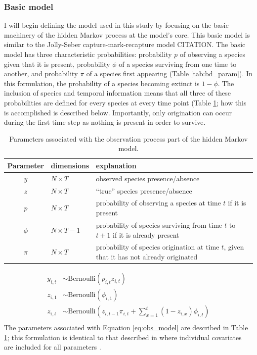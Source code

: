 \documentclass[12pt,letterpaper]{article}
\begin{document}
\subsubsection*{Basic model}
I will begin defining the model used in this study by focusing on the basic machinery of the hidden Markov process at the model's core. This basic model is similar to the Jolly-Seber capture-mark-recapture model CITATION.
The basic model has three characteristic probabilities: probability \(p\) of observing a species given that it is present, probability \(\phi\) of a species surviving from one time to another, and probability \(\pi\) of a species first appearing \citep{Royle2008} (Table \ref{tab:bd_param}). In this formulation, the probability of a species becoming extinct is \(1 - \phi\). The inclusion of species and temporal information means that all three of these probabilities are defined for every species at every time point (Table \ref{tab:obs_param}; how this is accomplished is described below. Importantly, only origination can occur during the first time step as nothing is present in order to survive.


\begin{table}
  \centering
  \caption{Parameters associated with the observation process part of the hidden Markov model.}
  \begin{tabular}{c l l}
    Parameter & dimensions & explanation \\
    \hline
    \(y\) & \(N \times T\) & observed species presence/absence \\
    \(z\) & \(N \times T\) & ``true'' species presence/absence \\
    \(p\) & \(N \times T\) & probability of observing a species at time \(t\) if it is present \\
    \(\phi\) & \(N \times T - 1\) & probability of species surviving from time \(t\) to \(t + 1\) if it is already present \\
    \(\pi\) & \(N \times T\) & probability of species origination at time \(t\), given that it has not already originated \\
  \end{tabular}
  \label{tab:obs_param}
\end{table}

\begin{equation}
  \begin{aligned}
    y_{i, t} &\sim \text{Bernoulli}(p_{i, t} z_{i, t}) \\
    z_{i, 1} &\sim \text{Bernoulli}(\phi_{i, 1}) \\
    z_{i, t} &\sim \text{Bernoulli}\left(z_{i, t - 1} \pi_{i,t} + \sum_{x = 1}^{t}(1 - z_{i, x}) \phi_{i,t}\right) \\
  \end{aligned}
  \label{eq:obs_model}
\end{equation}
The parameters associated with Equation \ref{eq:obs_model} are described in Table \ref{tab:obs_param}; this formulation is identical to that described in where individual covariates are included for all parameters \citep{Royle2008}.
\end{document}
